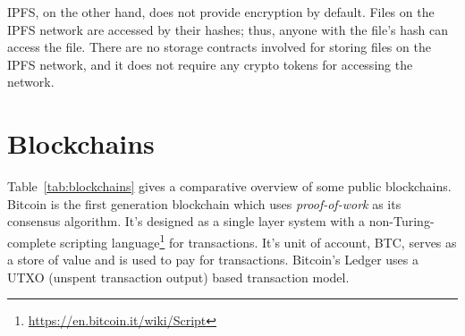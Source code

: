 		IPFS, on the other hand, does not provide encryption by default. Files on the IPFS network are accessed by their hashes; thus, anyone with the file's hash can access the file. There are no storage contracts involved for storing files on the IPFS network, and it does not require any crypto tokens for accessing the network.
		
		\section{Blockchains}
		Table~\ref{tab:blockchains} gives a comparative overview of some public blockchains. Bitcoin\cite{nakamoto2008bitcoin} is the first generation blockchain which uses \textit{proof-of-work} as its consensus algorithm. It's designed as a single layer system with a non-Turing-complete scripting language\footnote{\url{https://en.bitcoin.it/wiki/Script}} for transactions. It's unit of account, BTC, serves as a store of value and is used to pay for transactions. Bitcoin's Ledger uses a UTXO (unspent transaction output) based transaction model.
	
